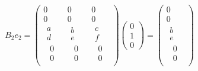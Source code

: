\documentclass[oneside,english]{amsbook}
\numberwithin{section}{chapter}
\theoremstyle{plain}
\theoremstyle{definition}
\begin{document}
\[B_{2}e_{2} = \begin{pmatrix}
	0 & 0 & 0 \\
	0 & 0 & 0 \\
	\begin{matrix}
		a \\
		d \\
		\begin{matrix}
			0 \\
			0
		\end{matrix}
	\end{matrix} & \begin{matrix}
		b \\
		e \\
		\begin{matrix}
			0 \\
			0
		\end{matrix}
	\end{matrix} & \begin{matrix}
		c \\
		f \\
		\begin{matrix}
			0 \\
			0
		\end{matrix}
	\end{matrix}
\end{pmatrix}\begin{pmatrix}
	0 \\
	1 \\
	0
\end{pmatrix} = \begin{pmatrix}
	0 \\
	0 \\
	\begin{matrix}
		b \\
		e \\
		\begin{matrix}
			0 \\
			0
		\end{matrix}
	\end{matrix}
\end{pmatrix}\]
\end{document}
